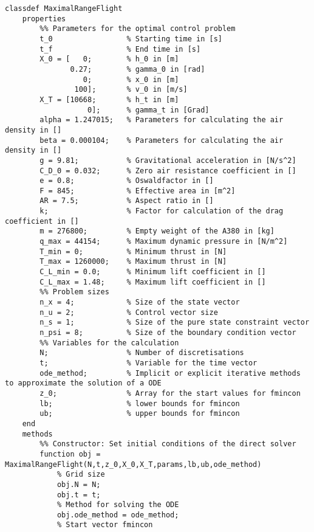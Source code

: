 \begin{lstlisting}[style=num_octave, caption={Matlab Programmcode von \texttt{maximalrangeflight.m}.}, label=code:direct_maximalrangeflight]
classdef MaximalRangeFlight
    properties
        %% Parameters for the optimal control problem
        t_0                 % Starting time in [s]
        t_f                 % End time in [s]
        X_0 = [   0;        % h_0 in [m]
               0.27;        % gamma_0 in [rad]
                  0;        % x_0 in [m]
                100];       % v_0 in [m/s]
        X_T = [10668;       % h_t in [m]
                   0];      % gamma_t in [Grad]
        alpha = 1.247015;   % Parameters for calculating the air density in []
        beta = 0.000104;    % Parameters for calculating the air density in []
        g = 9.81;           % Gravitational acceleration in [N/s^2]
        C_D_0 = 0.032;      % Zero air resistance coefficient in []             
        e = 0.8;            % Oswaldfactor in []
        F = 845;            % Effective area in [m^2]
        AR = 7.5;           % Aspect ratio in []
        k;                  % Factor for calculation of the drag coefficient in []
        m = 276800;         % Empty weight of the A380 in [kg]
        q_max = 44154;      % Maximum dynamic pressure in [N/m^2]
        T_min = 0;          % Minimum thrust in [N]
        T_max = 1260000;    % Maximum thrust in [N]
        C_L_min = 0.0;      % Minimum lift coefficient in []
        C_L_max = 1.48;     % Maximum lift coefficient in []
        %% Problem sizes
        n_x = 4;            % Size of the state vector
        n_u = 2;            % Control vector size
        n_s = 1;            % Size of the pure state constraint vector
        n_psi = 8;          % Size of the boundary condition vector
        %% Variables for the calculation
        N;                  % Number of discretisations
        t;                  % Variable for the time vector
        ode_method;         % Implicit or explicit iterative methods to approximate the solution of a ODE
        z_0;                % Array for the start values for fmincon
        lb;                 % lower bounds for fmincon
        ub;                 % upper bounds for fmincon
    end
    methods
        %% Constructor: Set initial conditions of the direct solver
        function obj = MaximalRangeFlight(N,t,z_0,X_0,X_T,params,lb,ub,ode_method)
            % Grid size
            obj.N = N;
            obj.t = t;
            % Method for solving the ODE
            obj.ode_method = ode_method;
            % Start vector fmincon

\end{lstlisting}
